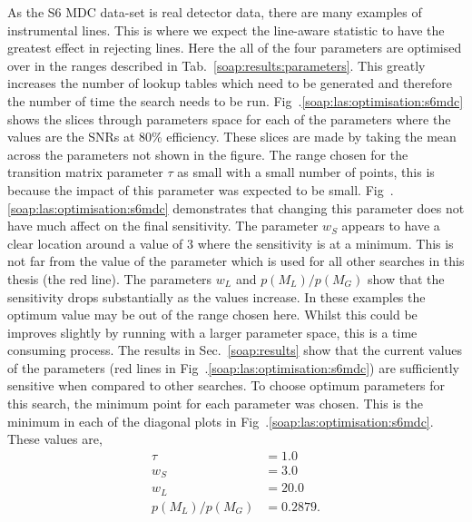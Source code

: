 As the S6 \gls{MDC} data-set is real detector data, there are many examples of instrumental lines. 
This is where we expect the line-aware statistic to have the greatest effect in rejecting lines. 
Here the all of the four parameters are optimised over in the ranges described in Tab.~\ref{soap:results:parameters}. 
This greatly increases the number of lookup tables which need to be generated and therefore the number of time the search needs to be run. 
Fig~.\ref{soap:las:optimisation:s6mdc} shows the slices through parameters space for each of the parameters where the values are the \glspl{SNR} at 80\% efficiency.  
These slices are made by taking the mean across the parameters not shown in the figure.
The range chosen for the transition matrix parameter $\tau$ as small with a small number of points, this is because the impact of this parameter was expected to be small. 
Fig~.\ref{soap:las:optimisation:s6mdc} demonstrates that changing this parameter does not have much affect on the final sensitivity. 
The parameter $w_S$ appears to have a clear location around a value of $3$ where the sensitivity is at a minimum. This is not far from the value of the parameter which is used for all other searches in this thesis (the red line).
The parameters $w_L$ and $p(M_L)/p(M_G)$ show that the sensitivity drops substantially as the values increase. 
In these examples the optimum value may be out of the range chosen here.
Whilst this could be improves slightly by running with a larger parameter space, this is a time consuming process.
The results in Sec.~\ref{soap:results} show that the current values of the parameters (red lines in Fig~.\ref{soap:las:optimisation:s6mdc}) are sufficiently sensitive when compared to other searches.
To choose optimum parameters for this search, the minimum point for each parameter was chosen. 
This is the minimum in each of the diagonal plots in Fig~.\ref{soap:las:optimisation:s6mdc}.
These values are,
\begin{equation}
\begin{split}
	\tau &= 1.0 \\
	w_S &= 3.0 \\
	w_L &= 20.0 \\
	p(M_L)/p(M_G) &= 0.2879 .
\end{split}
\end{equation}

